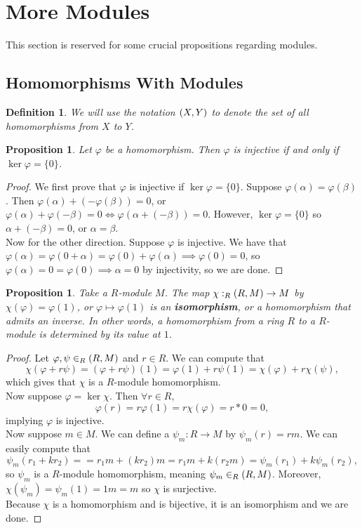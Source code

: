 \documentclass{article}
\theoremstyle{norm}
\newtheorem{df}[thm]{Definition}
\newtheorem{prop}[thm]{Proposition}
\let\hom\relax
\DeclareMathOperator{\hom}{Hom}
\begin{document}
\section{More Modules}
This section is reserved for some crucial propositions regarding
modules.

\subsection{Homomorphisms With Modules}

\begin{df}
We will use the notation $\hom(X, Y)$ to denote the set of all
homomorphisms from $X$ to $Y$.
\end{df}

\begin{prop}
Let $\varphi$ be a homomorphism. Then $\varphi$ is injective if and only
if $\ker \varphi = \lbrace 0 \rbrace$.
\end{prop}
\begin{proof}
We first prove that $\varphi$ is injective if $\ker \varphi = \lbrace 0
\rbrace$. Suppose $\varphi(\alpha) = \varphi(\beta)$. Then
$\varphi(\alpha) + (-\varphi(\beta)) = 0$, or $\varphi(\alpha) +
\varphi(-\beta) = 0 \iff \varphi(\alpha + (-\beta)) = 0$. However, $\ker
\varphi = \lbrace 0 \rbrace$ so $\alpha + (-\beta) = 0$, or $\alpha =
\beta$. \\
Now for the other direction. Suppose $\varphi$ is injective. We have
that $\varphi(\alpha) = \varphi(0 + \alpha) = \varphi(0) +
\varphi(\alpha) \implies \varphi(0) = 0$, so $\varphi(\alpha) = 0 =
\varphi(0) \implies \alpha = 0$ by injectivity, so we are done.
\end{proof}

\begin{prop}
Take a $R$-module $M$. The map $\chi : \hom_R(R, M) \rightarrow M$ by
$\chi(\varphi) = \varphi(1)$, or $\varphi \mapsto \varphi(1)$ is an
\textbf{isomorphism}, or a homomorphism that admits an inverse. In other
words, a homomorphism from a ring $R$ to a $R$-module is determined by
its value at $1$.
\end{prop}
\begin{proof}
Let $\varphi, \psi \in \hom_R(R, M)$ and $r \in R$. We can compute that
\[ \chi(\varphi + r \psi) = (\varphi + r \psi)(1) = \varphi(1) + r
\psi(1) = \chi(\varphi) + r \chi(\psi), \]
which gives that $\chi$ is a $R$-module homomorphism. \\
Now suppose $\varphi = \ker \chi$. Then $\forall r \in R$, 
\[ \varphi(r) = r \varphi(1) = r \chi(\varphi) = r * 0 = 0, \]
implying $\varphi$ is injective. \\
Now suppose $m \in M$. We can define a $\psi_m : R \rightarrow M$ by
$\psi_m(r) = rm$. We can easily compute that
\[ \psi_m(r_1 + k r_2) = = r_1 m + (k r_2) m = r_1 m + k (r_2 m) =
\psi_m(r_1) + k \psi_m(r_2), \]
so $\psi_m$ is a $R$-module homomorphism, meaning $\psi_m \in \hom_R(R,
M)$. Moreover, $\chi(\psi_m) = \psi_m(1) = 1m = m$ so $\chi$ is
surjective. \\
Because $\chi$ is a homomorphism and is bijective, it is an isomorphism
and we are done.
\end{proof}
\end{document}
